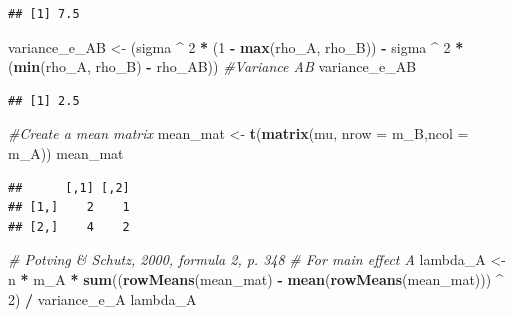 \documentclass[]{book}
\newenvironment{Shaded}{\begin{snugshade}}{\end{snugshade}}
\newcommand{\CommentTok}[1]{\textcolor[rgb]{0.56,0.35,0.01}{\textit{#1}}}
\newcommand{\DataTypeTok}[1]{\textcolor[rgb]{0.13,0.29,0.53}{#1}}
\newcommand{\DecValTok}[1]{\textcolor[rgb]{0.00,0.00,0.81}{#1}}
\newcommand{\KeywordTok}[1]{\textcolor[rgb]{0.13,0.29,0.53}{\textbf{#1}}}
\newcommand{\NormalTok}[1]{#1}
\newcommand{\OperatorTok}[1]{\textcolor[rgb]{0.81,0.36,0.00}{\textbf{#1}}}
\newcommand{\StringTok}[1]{\textcolor[rgb]{0.31,0.60,0.02}{#1}}
\begin{document}
\begin{verbatim}
## [1] 7.5
\end{verbatim}

\begin{Shaded}
\begin{Highlighting}[]
\NormalTok{variance_e_AB <-}
\StringTok{  }\NormalTok{(sigma }\OperatorTok{^}\StringTok{ }\DecValTok{2} \OperatorTok{*}\StringTok{ }\NormalTok{(}\DecValTok{1} \OperatorTok{-}\StringTok{ }\KeywordTok{max}\NormalTok{(rho_A, rho_B)) }\OperatorTok{-}\StringTok{ }
\StringTok{     }\NormalTok{sigma }\OperatorTok{^}\StringTok{ }\DecValTok{2} \OperatorTok{*}\StringTok{ }\NormalTok{(}\KeywordTok{min}\NormalTok{(rho_A, rho_B) }\OperatorTok{-}\StringTok{ }\NormalTok{rho_AB)) }
\CommentTok{#Variance AB}
\NormalTok{variance_e_AB}
\end{Highlighting}
\end{Shaded}

\begin{verbatim}
## [1] 2.5
\end{verbatim}

\begin{Shaded}
\begin{Highlighting}[]
\CommentTok{#Create a mean matrix}
\NormalTok{mean_mat <-}\StringTok{ }\KeywordTok{t}\NormalTok{(}\KeywordTok{matrix}\NormalTok{(mu, }\DataTypeTok{nrow =}\NormalTok{ m_B,}\DataTypeTok{ncol =}\NormalTok{ m_A)) }
\NormalTok{mean_mat}
\end{Highlighting}
\end{Shaded}

\begin{verbatim}
##      [,1] [,2]
## [1,]    2    1
## [2,]    4    2
\end{verbatim}

\begin{Shaded}
\begin{Highlighting}[]
\CommentTok{# Potving & Schutz, 2000, formula 2, p. 348}
\CommentTok{# For main effect A}
\NormalTok{lambda_A <-}
\StringTok{  }\NormalTok{n }\OperatorTok{*}\StringTok{ }\NormalTok{m_A }\OperatorTok{*}\StringTok{ }\KeywordTok{sum}\NormalTok{((}\KeywordTok{rowMeans}\NormalTok{(mean_mat) }\OperatorTok{-}\StringTok{ }
\StringTok{                   }\KeywordTok{mean}\NormalTok{(}\KeywordTok{rowMeans}\NormalTok{(mean_mat))) }\OperatorTok{^}\StringTok{ }\DecValTok{2}\NormalTok{) }\OperatorTok{/}\StringTok{ }\NormalTok{variance_e_A}
\NormalTok{  lambda_A}
\end{Highlighting}
\end{Shaded}
\end{document}
